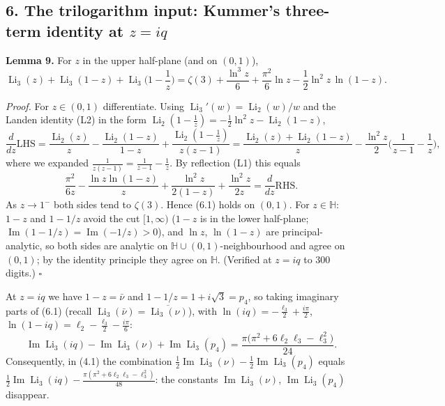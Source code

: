 \documentclass[11pt]{article}
\theoremstyle{remark}
\begin{document}
\subsection*{6. The trilogarithm input: Kummer's three-term identity at $z=iq$}

\textbf{Lemma 9.} For $z$ in the upper half-plane (and on $(0,1)$),
\begin{equation*}
\operatorname{Li}_3(z)+\operatorname{Li}_3(1-z)+\operatorname{Li}_3\!\Big(1-\frac1z\Big)
=\zeta(3)+\frac{\ln^3 z}{6}+\frac{\pi^2}{6}\ln z-\frac12\ln^2z\,\ln(1-z). \tag{6.1}
\end{equation*}

\textit{Proof.} For $z\in(0,1)$ differentiate. Using $\operatorname{Li}_3'(w)=\operatorname{Li}_2(w)/w$ and the Landen identity (L2) in the form $\operatorname{Li}_2(1-\tfrac1z)=-\tfrac12\ln^2z-\operatorname{Li}_2(1-z)$,
\[
\frac{d}{dz}\mathrm{LHS}
=\frac{\operatorname{Li}_2(z)}{z}-\frac{\operatorname{Li}_2(1-z)}{1-z}+\frac{\operatorname{Li}_2(1-\tfrac1z)}{z(z-1)}
=\frac{\operatorname{Li}_2(z)+\operatorname{Li}_2(1-z)}{z}-\frac{\ln^2z}{2}\Big(\frac1{z-1}-\frac1z\Big),
\]
where we expanded $\frac1{z(z-1)}=\frac1{z-1}-\frac1z$. By reflection (L1) this equals
\[
\frac{\pi^2}{6z}-\frac{\ln z\ln(1-z)}{z}+\frac{\ln^2z}{2(1-z)}+\frac{\ln^2 z}{2z}
=\frac{d}{dz}\mathrm{RHS}.
\]
As $z\to1^-$ both sides tend to $\zeta(3)$. Hence (6.1) holds on $(0,1)$. For $z\in\mathbb H$: $1-z$ and $1-1/z$ avoid the cut $[1,\infty)$ ($1-z$ is in the lower half-plane; $\operatorname{Im}(1-1/z)=\operatorname{Im}(-1/z)>0$), and $\ln z$, $\ln(1-z)$ are principal-analytic, so both sides are analytic on $\mathbb H\cup(0,1)$-neighbourhood and agree on $(0,1)$; by the identity principle they agree on $\mathbb H$. (Verified at $z=iq$ to $300$ digits.) $\square$

At $z=iq$ we have $1-z=\bar\nu$ and $1-1/z=1+i\sqrt3=p_4$, so taking imaginary parts of (6.1) (recall $\operatorname{Li}_3(\bar\nu)=\overline{\operatorname{Li}_3(\nu)}$), with $\ln(iq)=-\tfrac{\ell_3}2+\tfrac{i\pi}2$, $\ln(1-iq)=\ell_2-\tfrac{\ell_3}{2}-\tfrac{i\pi}6$:
\begin{equation*}
\operatorname{Im}\operatorname{Li}_3(iq)-\operatorname{Im}\operatorname{Li}_3(\nu)+\operatorname{Im}\operatorname{Li}_3(p_4)
=\frac{\pi\big(\pi^2+6\ell_2\ell_3-\ell_3^2\big)}{24}. \tag{6.2}
\end{equation*}
Consequently, in (4.1) the combination $\tfrac12\operatorname{Im}\operatorname{Li}_3(\nu)-\tfrac12\operatorname{Im}\operatorname{Li}_3(p_4)$ equals $\tfrac12\operatorname{Im}\operatorname{Li}_3(iq)-\tfrac{\pi(\pi^2+6\ell_2\ell_3-\ell_3^2)}{48}$: the constants $\operatorname{Im}\operatorname{Li}_3(\nu)$, $\operatorname{Im}\operatorname{Li}_3(p_4)$ disappear.
\end{document}
